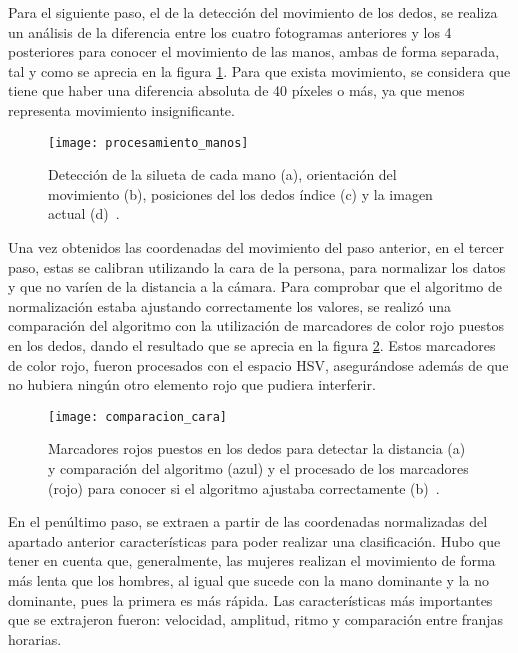 Para el siguiente paso, el de la detección del movimiento de los dedos, se realiza un análisis de la diferencia entre los cuatro fotogramas anteriores y los 4 posteriores para conocer el movimiento de las manos, ambas de forma separada, tal y como se aprecia en la figura \ref{fig:procesamientomanos}. Para que exista movimiento, se considera que tiene que haber una diferencia absoluta de 40 píxeles o más, ya que menos representa movimiento insignificante.

\begin{figure}[h]
	\texttt{[image: procesamiento\_manos]}
	\caption[Detección de la silueta de cada mano, orientación del movimiento, posiciones del los dedos índice y la imagen actual.]{Detección de la silueta de cada mano (a), orientación del movimiento (b), posiciones del los dedos índice (c) y la imagen actual (d)~\cite{khan2014computer}.}
	\label{fig:procesamientomanos}
\end{figure}

Una vez obtenidos las coordenadas del movimiento del paso anterior, en el tercer paso, estas se calibran utilizando la cara de la persona, para normalizar los datos y que no varíen de la distancia a la cámara. Para comprobar que el algoritmo de normalización estaba ajustando correctamente los valores, se realizó una comparación del algoritmo con la utilización de marcadores de color rojo puestos en los dedos, dando el resultado que se aprecia en la figura \ref{fig:comparacioncara}. Estos marcadores de color rojo, fueron procesados con el espacio HSV, asegurándose además de que no hubiera ningún otro elemento rojo que pudiera interferir.

\begin{figure}[h]
	\texttt{[image: comparacion\_cara]}
	\caption[Marcadores rojos y comparación del algoritmo y el procesado de los marcadores.]{Marcadores rojos puestos en los dedos para detectar la distancia (a) y comparación del algoritmo (azul) y el procesado de los marcadores (rojo) para conocer si el algoritmo ajustaba correctamente (b)~\cite{khan2014computer}.}
	\label{fig:comparacioncara}
\end{figure}

En el penúltimo paso, se extraen a partir de las coordenadas normalizadas del apartado anterior características para poder realizar una clasificación. Hubo que tener en cuenta que, generalmente, las mujeres realizan el movimiento de forma más lenta que los hombres, al igual que sucede con la mano dominante y la no dominante, pues la primera es más rápida. Las características más importantes que se extrajeron fueron: velocidad, amplitud, ritmo y comparación entre franjas horarias.

